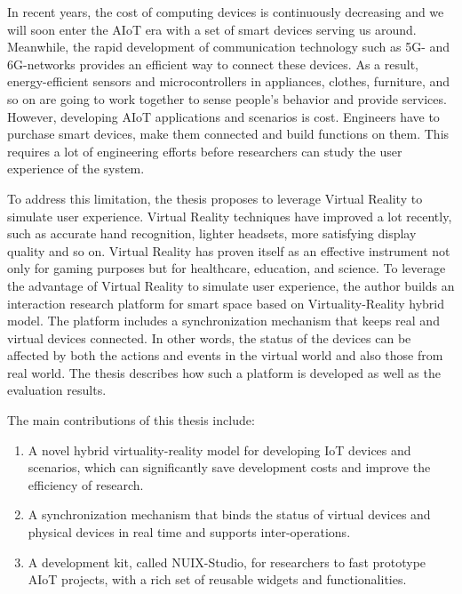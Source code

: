 \begin{abstract*}

In recent years, the cost of computing devices is continuously decreasing and we will soon enter the AIoT era with a set of smart devices serving us around. Meanwhile, the rapid development of communication technology such as 5G- and 6G-networks provides an efficient way to connect these devices. As a result, energy-efficient sensors and microcontrollers in appliances, clothes, furniture, and so on are going to work together to sense people’s behavior and provide services. However, developing AIoT applications and scenarios is cost. Engineers have to purchase smart devices, make them connected and build functions on them. This requires a lot of engineering efforts before researchers can study the user experience of the system.   

To address this limitation, the thesis proposes to leverage Virtual Reality to simulate user experience.  Virtual Reality techniques have improved a lot recently, such as accurate hand recognition, lighter headsets, more satisfying display quality and so on. Virtual Reality has proven itself as an effective instrument not only for gaming purposes but for healthcare, education, and science. To leverage the advantage of Virtual Reality to simulate user experience, the author builds an interaction research platform for smart space based on Virtuality-Reality hybrid model. The platform includes a synchronization mechanism that keeps real and virtual devices connected. In other words, the status of the devices can be affected by both the actions and events in the virtual world and also those from real world. The thesis describes how such a platform is developed as well as the evaluation results.

The main contributions of this thesis include: 
  
  \begin{enumerate}
      \item A novel hybrid virtuality-reality model for developing IoT devices and scenarios, which can significantly save development costs and improve the efficiency of research. 
      \item A synchronization mechanism that binds the status of virtual devices and physical devices in real time and supports inter-operations. 
      \item A development kit, called NUIX-Studio, for researchers to fast prototype AIoT projects, with a rich set of reusable widgets and functionalities.
  \end{enumerate}


  
\end{abstract*}
